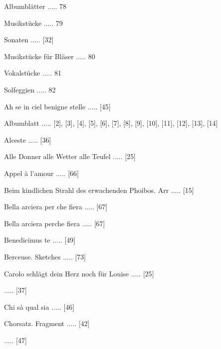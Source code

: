 \documentclass[a4paper, twocolumn, 11pt]{book}
\begin{document}
 Albumblätter ..... 78

 Musikstücke ..... 79

 Sonaten ..... [32]

 Musikstücke für Bläser ..... 80

 Vokalstücke ..... 81

 Solfeggien ..... 82

\newline 
Ah se in ciel benigne stelle ..... [45]

\newline 
Albumblatt ..... [2], [3], [4], [5], [6], [7], [8], [9], [10], [11], [12], [13], [14]

\newline 
Alceste ..... [36]

\newline 
Alle Donner alle Wetter alle Teufel ..... [25]

\newline 
Appel à l'amour ..... [66]

\newline 
Beim kindlichen Strahl des erwachenden Phoibos. Arr ..... [15]

\newline 
Bella arciera per che fiera ..... [67]

\newline 
Bella arciera perche fiera ..... [67]

\newline 
Benedicimus te ..... [49]

\newline 
Berceuse. Sketches ..... [73]

\newline 
Carolo schlägt dein Herz noch für Louise ..... [25]

 ..... [37]

\newline 
Chi sà qual sia ..... [46]

\newline 
Chorsatz. Fragment ..... [42]

 ..... [47]
\end{document}
